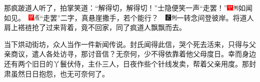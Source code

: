 那疯跛道人听了，拍掌笑道：``解得切，解得切！''士隐便笑一声``走罢！''{{\includegraphics[width=3mm]{../Images/00002}\includegraphics[width=3mm]{../Images/00011}\footnotesize 如闻如见。　\includegraphics[width=3mm]{../Images/00002}\includegraphics[width=3mm]{../Images/00010}\footnotesize  ``走罢''二字，真悬崖撒手，若个能行？　}\includegraphics[width=3mm]{../Images/00006}\includegraphics[width=3mm]{../Images/00011}\footnotesize 一转念间登彼岸。}将道人肩上褡裢抢了过来背着，竟不回家，同了疯道人飘飘而去。

当下烘动街坊，众人当作一件新闻传说。封氏闻得此信，哭个死去活来，只得与父亲商议，遣人各处访寻，那讨音信？无奈何，少不得依靠着他父母度日。幸而身边还有两个旧日的丫鬟伏侍，主仆三人，日夜作些个针线发卖，帮着父亲用度。那封肃虽然日日抱怨，也无可奈何了。

